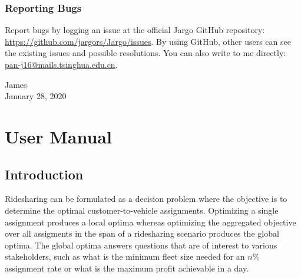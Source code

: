 \section*{Reporting Bugs}

Report bugs by logging an issue at the official Jargo GitHub repository:
\url{https://github.com/jargors/Jargo/issues}. By using GitHub, other users can
see the existing issues and possible resolutions. You can also write to me
directly: \url{pan-j16@mails.tsinghua.edu.cn}.


\bigskip
\begin{flushright}
James\\
January 28, 2020
\end{flushright}

\part{User Manual}
\chapter{Introduction}
\label{intro}
\renewcommand{\thepage}{\arabic{page}}
\setcounter{page}{1}


\vspace{2em}
Ridesharing can be formulated as a decision problem where the objective is to
determine the optimal customer-to-vehicle assignments. Optimizing a single
assignment produces a local optima whereas optimizing the aggregated
objective over all assigments in the span of a ridesharing scenario produces
the global optima. The global optima answers questions that are of
interest to various stakeholders, such as what is the minimum fleet size needed
for an $n$\% assignment rate or what is the maximum profit achievable in a day.


